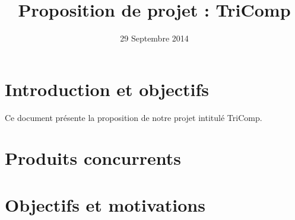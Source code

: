 \documentclass{article}
\title{Proposition de projet : TriComp}
\author{}
\date{29 Septembre 2014}
\begin{document}
\maketitle
\pagebreak

%

%



\section{Introduction et objectifs}

Ce document présente la proposition de notre projet intitulé TriComp.


\section{Produits concurrents}

\section{Objectifs et motivations}
\end{document}
